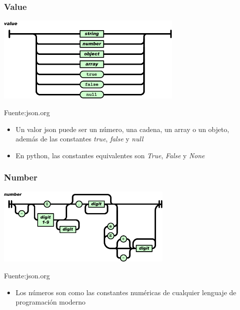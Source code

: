 \documentclass[ucs]{beamer}
\begin{document}
\begin{frame}[fragile]
\frametitle{Value}
\begin{center}
  \includegraphics[width=09.0cm]{figs/value}
\end{center}
\begin{flushright}
\begin{tiny}
Fuente:json.org
\end{tiny}
\end{flushright}
\begin{itemize}
\item 
Un valor json puede ser un número, una cadena, un array o
un objeto, además de las constantes 
\emph{true},
\emph{false} y 
\emph{null}
\item
En python, las constantes equivalentes son 
\emph{True},
\emph{False} y 
\emph{None}
\end{itemize}
\end{frame}




\begin{frame}[fragile]
\frametitle{Number}
\begin{center}
  \includegraphics[width=08.5cm]{figs/number}
\end{center}
\begin{flushright}
\begin{tiny}
Fuente:json.org
\end{tiny}
\end{flushright}
\begin{itemize}
\item 
Los números son como las constantes numéricas
de cualquier lenguaje de programación moderno
\end{itemize}
\end{frame}
\end{document}
